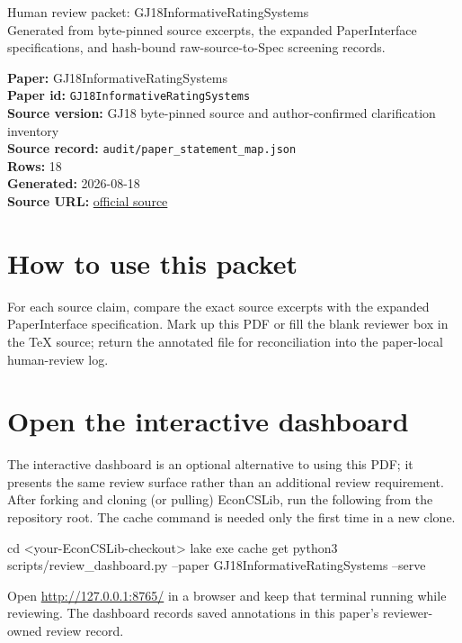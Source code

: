 \documentclass[10pt]{article}
\begin{document}
\fontsize{9}{10}\selectfont

\begin{center}
{\LARGE Human review packet: GJ18InformativeRatingSystems}\\[0.35em]
\small Generated from byte-pinned source excerpts, the expanded PaperInterface
specifications, and hash-bound raw-source-to-Spec screening records.
\end{center}

\noindent\textbf{Paper:} GJ18InformativeRatingSystems\\
\textbf{Paper id:} \texttt{GJ18InformativeRatingSystems}\\
\textbf{Source version:} GJ18 byte-pinned source and author-confirmed clarification inventory\\
\textbf{Source record:} \texttt{audit/paper\_statement\_map.json}\\
\textbf{Rows:} 18\\
\textbf{Generated:} 2026-08-18\\
\textbf{Source URL:} \href{https://arxiv.org/pdf/1810.13028}{official source}

\noindent{}\par



\section*{How to use this packet}
For each source claim, compare the exact source excerpts with the expanded
PaperInterface specification. Mark up this PDF or fill the blank reviewer box in the TeX source;
return the annotated file for reconciliation into the paper-local human-review
log.

\section*{Open the interactive dashboard}
The interactive dashboard is an optional alternative to using this PDF; it
presents the same review surface rather than an additional review requirement.
After forking and cloning (or pulling) EconCSLib, run the following from the
repository root. The cache command is needed only the first time in a new clone.
\begin{ReviewVerbatim}
cd <your-EconCSLib-checkout>
lake exe cache get
python3 scripts/review_dashboard.py --paper GJ18InformativeRatingSystems --serve
\end{ReviewVerbatim}
Open \url{http://127.0.0.1:8765/} in a browser and keep that terminal running
while reviewing. The dashboard records saved annotations in this paper's
reviewer-owned review record.
\end{document}
